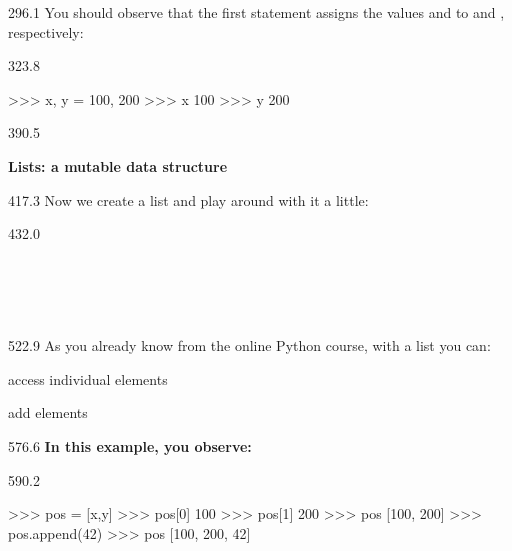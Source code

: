 \documentclass{aslab}
\newcommand*\inp[1]{\makebox[26.4bp][l]{\ttfamily(#1)}}
\newcommand*\codexi[1]{\fontsize{11bp}{#1bp}\ttfamily\lineskiplimit=-\maxdimen}
\begin{document}
\begin{region}[x=74.7,right=0,pitch=14.3]{296.1}
You should observe that the first statement assigns the values 
and  to  and , respectively:
\end{region}

\begin{region}[x=74.7,right=0,pitch=13.2]{323.8}
\begin{codeblock}[basicstyle=\codexi{13.2}]
>>> x, y = 100, 200
>>> x
100
>>> y
200
\end{codeblock}
\end{region}

\begin{region}{390.5}
\begin{tasks}[start=2]
\item \textbf{Lists: a mutable data structure}
\end{tasks}
\end{region}

\begin{region}[x=74.7,right=0]{417.3}
Now we create a list  and play around with it a little:
\end{region}

\begin{region}[x=74.7,right=0,pitch=15.4]{432.0}
\inp{1}\\
\inp{2}\\
\inp{3}\\
\inp{4}\\
\inp{5}\\
\inp{6}
\end{region}

\begin{region}[x=74.7,right=0,pitch=13.9]{522.9}
As you already know from the online Python course, with a list you can:
\begin{dotlist}
\item access individual elements
\item add elements
\end{dotlist}
\end{region}

\begin{region}[x=74.7,right=0]{576.6}
\textbf{In this example, you observe:}
\end{region}

\begin{region}[x=74.7,right=0,pitch=13.2]{590.2}
\begin{codeblock}[basicstyle=\codexi{13.2}]
>>> pos = [x,y]
>>> pos[0]
100
>>> pos[1]
200
>>> pos
[100, 200]
>>> pos.append(42)
>>> pos
[100, 200, 42]
\end{codeblock}
\end{region}
\end{document}

